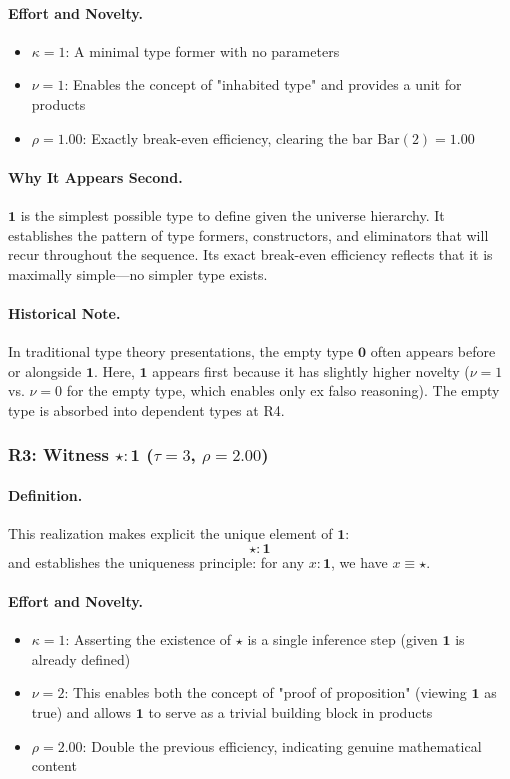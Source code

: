 \documentclass[11pt]{article}
\theoremstyle{definition}
\begin{document}
\paragraph{Effort and Novelty.}
\begin{itemize}
\item $\kappa = 1$: A minimal type former with no parameters
\item $\nu = 1$: Enables the concept of "inhabited type" and provides a unit for products
\item $\rho = 1.00$: Exactly break-even efficiency, clearing the bar $\text{Bar}(2) = 1.00$
\end{itemize}

\paragraph{Why It Appears Second.}
$\mathbf{1}$ is the simplest possible type to define given the universe hierarchy. It establishes the pattern of type formers, constructors, and eliminators that will recur throughout the sequence. Its exact break-even efficiency reflects that it is maximally simple—no simpler type exists.

\paragraph{Historical Note.}
In traditional type theory presentations, the empty type $\mathbf{0}$ often appears before or alongside $\mathbf{1}$. Here, $\mathbf{1}$ appears first because it has slightly higher novelty ($\nu=1$ vs. $\nu=0$ for the empty type, which enables only ex falso reasoning). The empty type is absorbed into dependent types at R4.

\subsubsection{R3: Witness $\star : \mathbf{1}$ ($\tau=3$, $\rho=2.00$)}

\paragraph{Definition.}
This realization makes explicit the unique element of $\mathbf{1}$:
\[
\star : \mathbf{1}
\]
and establishes the uniqueness principle: for any $x : \mathbf{1}$, we have $x \equiv \star$.

\paragraph{Effort and Novelty.}
\begin{itemize}
\item $\kappa = 1$: Asserting the existence of $\star$ is a single inference step (given $\mathbf{1}$ is already defined)
\item $\nu = 2$: This enables both the concept of "proof of proposition" (viewing $\mathbf{1}$ as true) and allows $\mathbf{1}$ to serve as a trivial building block in products
\item $\rho = 2.00$: Double the previous efficiency, indicating genuine mathematical content
\end{itemize}
\end{document}
